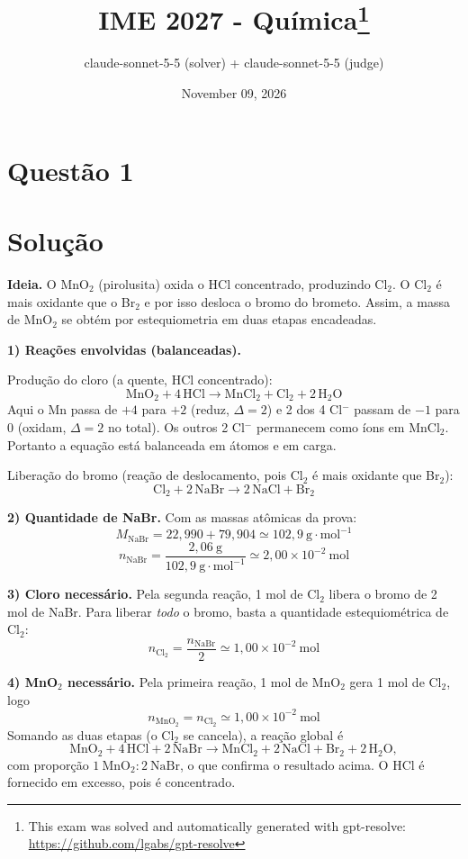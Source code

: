 \documentclass{article}%
\title{IME 2027 - Química\thanks{This exam was solved and automatically generated with gpt-resolve: \url{https://github.com/lgabs/gpt-resolve}}}%
\author{claude{-}sonnet{-}5{-}5 (solver) + claude{-}sonnet{-}5{-}5 (judge)}%
\date{November 09, 2026}%
\begin{document}
%
\normalsize%
\maketitle%
\section*{Questão 1}

\section*{Solução}

\textbf{Ideia.} O MnO$_2$ (pirolusita) oxida o HCl concentrado, produzindo Cl$_2$. O Cl$_2$ é mais oxidante que o Br$_2$ e por isso desloca o bromo do brometo. Assim, a massa de MnO$_2$ se obtém por estequiometria em duas etapas encadeadas.

\textbf{1) Reações envolvidas (balanceadas).}

Produção do cloro (a quente, HCl concentrado):
\[
\mathrm{MnO_2 + 4\,HCl \longrightarrow MnCl_2 + Cl_2 + 2\,H_2O}
\]
Aqui o Mn passa de $+4$ para $+2$ (reduz, $\Delta = 2$) e 2 dos 4 Cl$^-$ passam de $-1$ para $0$ (oxidam, $\Delta = 2$ no total). Os outros 2 Cl$^-$ permanecem como íons em MnCl$_2$. Portanto a equação está balanceada em átomos e em carga.

Liberação do bromo (reação de deslocamento, pois Cl$_2$ é mais oxidante que Br$_2$):
\[
\mathrm{Cl_2 + 2\,NaBr \longrightarrow 2\,NaCl + Br_2}
\]

\textbf{2) Quantidade de NaBr.} Com as massas atômicas da prova:
\[
M_{\mathrm{NaBr}} = 22{,}990 + 79{,}904 \simeq 102{,}9\ \mathrm{g\cdot mol^{-1}}
\]
\[
n_{\mathrm{NaBr}} = \frac{2{,}06\ \mathrm{g}}{102{,}9\ \mathrm{g\cdot mol^{-1}}} \simeq 2{,}00\times 10^{-2}\ \mathrm{mol}
\]

\textbf{3) Cloro necessário.} Pela segunda reação, 1 mol de Cl$_2$ libera o bromo de 2 mol de NaBr. Para liberar \emph{todo} o bromo, basta a quantidade estequiométrica de Cl$_2$:
\[
n_{\mathrm{Cl_2}} = \frac{n_{\mathrm{NaBr}}}{2} \simeq 1{,}00\times 10^{-2}\ \mathrm{mol}
\]

\textbf{4) MnO$_2$ necessário.} Pela primeira reação, 1 mol de MnO$_2$ gera 1 mol de Cl$_2$, logo
\[
n_{\mathrm{MnO_2}} = n_{\mathrm{Cl_2}} \simeq 1{,}00\times 10^{-2}\ \mathrm{mol}
\]
Somando as duas etapas (o Cl$_2$ se cancela), a reação global é
\[
\mathrm{MnO_2 + 4\,HCl + 2\,NaBr \longrightarrow MnCl_2 + 2\,NaCl + Br_2 + 2\,H_2O},
\]
com proporção $1\ \mathrm{MnO_2} : 2\ \mathrm{NaBr}$, o que confirma o resultado acima. O HCl é fornecido em excesso, pois é concentrado.
\end{document}

